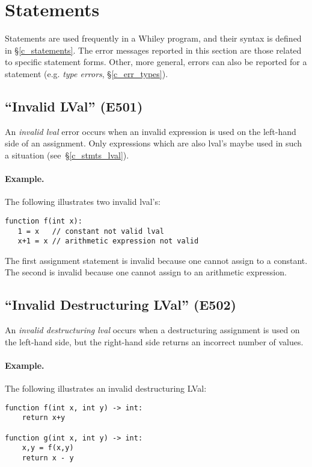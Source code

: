 \section{Statements}

Statements are used frequently in a Whiley program, and their syntax is defined in \S\ref{c_statements}.  The error messages reported in this section are those related to specific statement forms.  Other, more general, errors can also be reported for a statement (e.g. {\em type errors}, \S\ref{c_err_types}).

\subsection{``Invalid LVal'' (E501)}

An {\em invalid lval} error occurs when an invalid expression is used on the left-hand side of an assignment.  Only expressions which are also lval's maybe used in such a situation  (see~\S\ref{c_stmts_lval}).

\paragraph{Example.}  The following illustrates two invalid lval's:

\begin{lstlisting}
function f(int x):
   1 = x   // constant not valid lval
   x+1 = x // arithmetic expression not valid    
\end{lstlisting}

The first assignment statement is invalid because one cannot assign to a constant.  The second is invalid because one cannot assign to an arithmetic expression.

\subsection{``Invalid Destructuring LVal'' (E502)}

An {\em invalid destructuring lval} occurs when a destructuring assignment is used on the left-hand side, but the right-hand side returns an incorrect number of values.

\paragraph{Example.}  The following illustrates an invalid destructuring LVal:

\begin{lstlisting}
function f(int x, int y) -> int:
    return x+y

function g(int x, int y) -> int:
    x,y = f(x,y)
    return x - y
\end{lstlisting}

